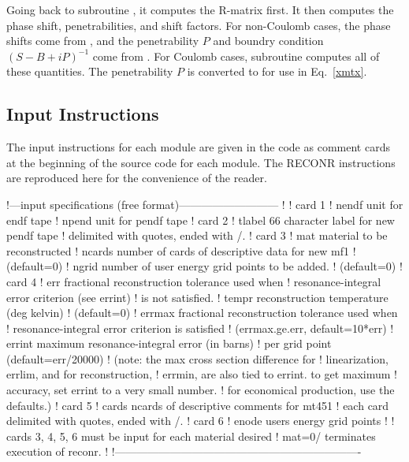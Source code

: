 Going back to subroutine , it computes the R-matrix
first.  It then computes the phase shift, penetrabilities, and
shift factors.  For non-Coulomb cases, the phase shifts come
from , and the penetrability $P$ and boundry
condition $(S-B+iP)^{-1}$ come from .  For Coulomb
cases, subroutine 
\noindent computes all of these
quantities.  The penetrability $P$ is converted to 
for use in Eq.~\ref{xmtx}.

\subsection{Input Instructions}
\label{ssRECONR_inp}

The input instructions for each module are given in the code
as comment cards at the beginning of the source code for each
module.  The RECONR instructions are reproduced here for the
convenience of the reader.

\small
\begin{ccode}

   !---input specifications (free format)---------------------------
   !
   ! card 1
   !    nendf    unit for endf tape
   !    npend    unit for pendf tape
   ! card 2
   !    tlabel   66 character label for new pendf tape
   !             delimited with quotes, ended with /.
   ! card 3
   !    mat      material to be reconstructed
   !    ncards   number of cards of descriptive data for new mf1
   !             (default=0)
   !    ngrid    number of user energy grid points to be added.
   !             (default=0)
   ! card 4
   !    err      fractional reconstruction tolerance used when
   !             resonance-integral error criterion (see errint)
   !             is not satisfied.
   !    tempr    reconstruction temperature (deg kelvin)
   !             (default=0)
   !    errmax   fractional reconstruction tolerance used when
   !             resonance-integral error criterion is satisfied
   !             (errmax.ge.err, default=10*err)
   !    errint   maximum resonance-integral error (in barns)
   !             per grid point (default=err/20000)
   !             (note: the max cross section difference for
   !             linearization, errlim, and for reconstruction,
   !             errmin, are also tied to errint.  to get maximum
   !             accuracy, set errint to a very small number.
   !             for economical production, use the defaults.)
   ! card 5
   !    cards    ncards of descriptive comments for mt451
   !             each card delimited with quotes, ended with /.
   ! card 6
   !    enode    users energy grid points
   !
   !     cards 3, 4, 5, 6 must be input for each material desired
   !     mat=0/ terminates execution of reconr.
   !
   !-------------------------------------------------------------------

\end{ccode}
\normalsize

